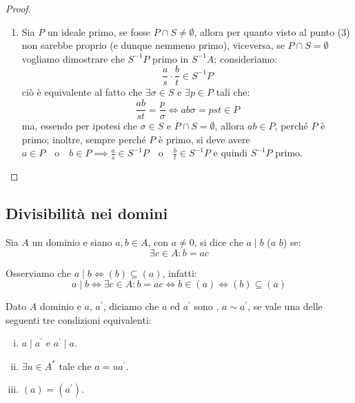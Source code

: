 \documentclass[11pt]{scrartcl}
\begin{document}
\begin{proof}
\begin{enumerate}[(1)]
        \item Sia $P$ un ideale primo, se fosse $P \cap S \ne \emptyset$, allora per quanto visto al punto (3) non sarebbe proprio (e dunque nemmeno primo), viceversa, se $P \cap S = \emptyset$ vogliamo dimostrare che $S^{-1}P$ primo in $S^{-1}A$; consideriamo:
                \[ \frac{a}{s} \cdot \frac{b}{t} \in S^{-1}P
                    \]
            ciò è equivalente al fatto che $\exists \sigma \in S$ e $\exists p \in P$ tali che:
                \[ \frac{ab}{st} = \frac{p}{\sigma} \iff ab\sigma = pst \in P
                    \]
            ma, essendo per ipotesi che $\sigma \in S$ e $P \cap S = \emptyset$, allora $ab \in P$, perché $P$ è primo; 
	    inoltre, sempre perché $P$ è primo, si deve avere $a \in P \quad \text{o} \quad b \in P \implies \frac{a}{s} \in S^{-1}P \quad \text{o} \quad \frac{b}{t} \in S^{-1}P$ e quindi $S^{-1}P$ primo.
    \end{enumerate}
\end{proof}

\newpage
\subsection{Divisibilità nei domini}
\begin{definition}
    Sia $A$  un dominio e siano $a,b \in A$, con $a \ne 0$, si dice che $a \mid b$ ($a$  $b$) se:
    \[ \exists c \in A : b = ac
        \]
\end{definition}

\begin{remark}
    Osserviamo che $a \mid b \iff (b) \subseteq (a)$, infatti:
    \[ a \mid b \iff \exists c \in A : b = ac \iff b \in (a) \iff (b) \subseteq (a)
        \]
\end{remark}

\begin{definition}
    Dato $A$ dominio e $a$, $a^{\prime}$, diciamo che $a$ ed $a^{\prime}$ sono , $a \sim a^{\prime}$,
    se vale una delle seguenti tre condizioni equivalenti:
    \begin{enumerate}[(i)]
        \item $a \mid a^{\prime}$ e $a^{\prime} \mid a$.
        \item $\exists u \in A^*$ tale che $a = ua^{\prime}$.
        \item $(a) = (a^{\prime})$.
    \end{enumerate}
\end{definition}
\end{document}
